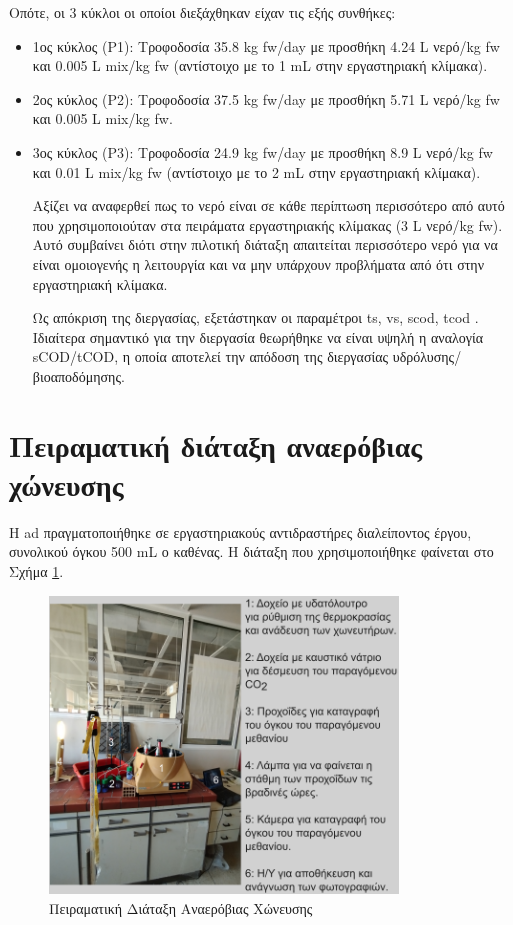 \documentclass[11pt]{report}
\begin{document}
Οπότε, οι 3 κύκλοι οι οποίοι διεξάχθηκαν είχαν τις εξής συνθήκες:
\begin{itemize}
\item 1ος κύκλος (P1): Τροφοδοσία 35.8 kg \acrshort{fw}/day με προσθήκη 4.24 L νερό/kg \acrshort{fw} και 0.005 L \acrshort{mix}/kg \acrshort{fw} (αντίστοιχο με το 1 mL στην εργαστηριακή κλίμακα).
\item 2ος κύκλος (P2): Τροφοδοσία 37.5 kg \acrshort{fw}/day με προσθήκη 5.71 L νερό/kg \acrshort{fw} και 0.005 L \acrshort{mix}/kg \acrshort{fw}.
\item 3ος κύκλος (P3): Τροφοδοσία 24.9 kg \acrshort{fw}/day με προσθήκη 8.9 L νερό/kg \acrshort{fw} και 0.01 L \acrshort{mix}/kg \acrshort{fw} (αντίστοιχο με το 2 mL στην εργαστηριακή κλίμακα).

Αξίζει να αναφερθεί πως το νερό είναι σε κάθε περίπτωση περισσότερο από αυτό που χρησιμοποιούταν στα πειράματα εργαστηριακής κλίμακας (3 L νερό/kg \acrshort{fw}). Αυτό συμβαίνει διότι στην πιλοτική διάταξη απαιτείται περισσότερο νερό για να είναι ομοιογενής η λειτουργία και να μην υπάρχουν προβλήματα από ότι στην εργαστηριακή κλίμακα.

Ως απόκριση της διεργασίας, εξετάστηκαν οι παραμέτροι \acrshort{ts}, \acrshort{vs}, \acrshort{scod}, \acrshort{tcod} . Ιδιαίτερα σημαντικό για την διεργασία θεωρήθηκε να είναι υψηλή η αναλογία sCOD/tCOD, η οποία αποτελεί την απόδοση της διεργασίας υδρόλυσης/βιοαποδόμησης.
\end{itemize}

\section{Πειραματική διάταξη αναερόβιας χώνευσης}
\label{sec:org80eebd6}
Η \acrshort{ad} πραγματοποιήθηκε σε εργαστηριακούς αντιδραστήρες διαλείποντος έργου, συνολικού όγκου 500 mL ο καθένας. Η διάταξη που χρησιμοποιήθηκε φαίνεται στο Σχήμα \ref{fig:org1fc0a68}.

\begin{figure}[htbp]
\centering
\includegraphics[width=350px]{./anaerobic_digestion_captioned.png}
\caption{\label{fig:org1fc0a68}Πειραματική Διάταξη Αναερόβιας Χώνευσης}
\end{figure}
\end{document}
